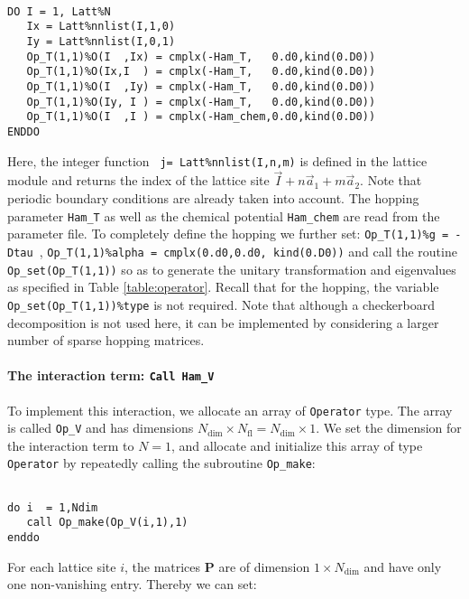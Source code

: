 \begin{lstlisting}

DO I = 1, Latt%N
   Ix = Latt%nnlist(I,1,0)
   Iy = Latt%nnlist(I,0,1)
   Op_T(1,1)%O(I  ,Ix) = cmplx(-Ham_T,   0.d0,kind(0.D0))
   Op_T(1,1)%O(Ix,I  ) = cmplx(-Ham_T,   0.d0,kind(0.D0))
   Op_T(1,1)%O(I  ,Iy) = cmplx(-Ham_T,   0.d0,kind(0.D0))
   Op_T(1,1)%O(Iy, I ) = cmplx(-Ham_T,   0.d0,kind(0.D0))
   Op_T(1,1)%O(I  ,I ) = cmplx(-Ham_chem,0.d0,kind(0.D0))
ENDDO

\end{lstlisting}
Here, the integer function \texttt{  j=  Latt\%nnlist(I,n,m)} is defined in the lattice module and returns the index of the lattice site $ \vec{I} +  n \vec{a}_1 +  m \vec{a}_2$.
Note that periodic boundary conditions are 
already taken into account.  The hopping parameter \texttt{Ham\_T} as well as the chemical potential \texttt{Ham\_chem} are read from the parameter file.  
To completely define the hopping  we further set: \texttt{Op\_T(1,1)\%g = -Dtau }, \texttt{Op\_T(1,1)\%alpha = cmplx(0.d0,0.d0, kind(0.D0))} and call the routine  \texttt{Op\_set(Op\_T(1,1))}  so as to generate  the unitary transformation and eigenvalues as specified in Table \ref{table:operator}.  Recall that for the hopping, the variable  \texttt{Op\_set(Op\_T(1,1))\%type}  is not  required. 
Note that although a checkerboard decomposition is not  used here,  it can be implemented by considering a larger number of sparse hopping matrices.


\paragraph{The interaction term: \texttt{Call Ham\_V}}

To implement this interaction, we allocate an array of \texttt{Operator} type. The array is called  \texttt{Op\_V} and has dimensions $N_{\mathrm{dim}}\times N_{\mathrm{fl}}=N_{\mathrm{dim}} \times 1$. 
We set the dimension for the interaction term to  $N=1$, and  allocate and initialize this array of type  \texttt{Operator} by repeatedly calling the subroutine \texttt{Op\_make}: 

\begin{lstlisting}

do i  = 1,Ndim
   call Op_make(Op_V(i,1),1)
enddo

\end{lstlisting}
For each lattice site $i$, the  matrices ${\bm P}$ are of dimension $1\times N_{\mathrm{dim}} $ and have only one non-vanishing entry. Thereby we can set:

